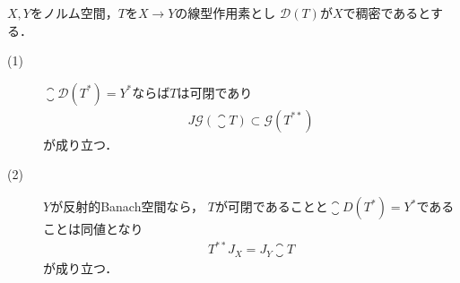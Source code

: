 	\begin{screen}
		\begin{thm}
			$X,Y$をノルム空間，$T$を$X \rightarrow Y$の線型作用素とし
			$\mathscr{D}(T)$が$X$で稠密であるとする．
			\begin{description}
				\item[(1)]
					$\closure{\mathscr{D}(T^*)} = Y^*$ならば$T$は可閉であり
					\begin{align}
						J\mathscr{G}(\closure{T}) \subset \mathscr{G}(T^{**})
					\end{align}
					が成り立つ．
				\item[(2)]
					$Y$が反射的Banach空間なら，
					$T$が可閉であることと$\closure{D}(T^*) = Y^*$であることは同値となり
					\begin{align}
						T^{**}J_X = J_Y \closure{T}
					\end{align}
					が成り立つ．
			\end{description}
		\end{thm}
	\end{screen}
	
